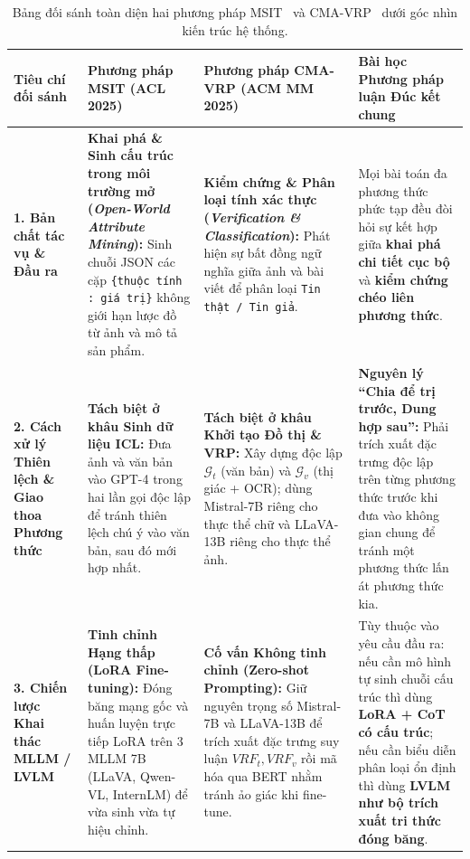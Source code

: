 \documentclass[conference,10pt]{IEEEtran}
\begin{document}
\begin{table}[!t]
\centering
\caption{Bảng đối sánh toàn diện hai phương pháp MSIT~\cite{li2025msit} và CMA-VRP~\cite{li2025cmavrp} dưới góc nhìn kiến trúc hệ thống.}
\label{tab:comparison_msit_cmavrp}
\begin{tabularx}{\textwidth}{L{2.8cm} Y Y Y}
\toprule
\textbf{Tiêu chí đối sánh} & \textbf{Phương pháp MSIT (ACL 2025)}~\cite{li2025msit} & \textbf{Phương pháp CMA-VRP (ACM MM 2025)}~\cite{li2025cmavrp} & \textbf{Bài học Phương pháp luận Đúc kết chung} \\
\midrule
\textbf{1. Bản chất tác vụ \& Đầu ra} & \textbf{Khai phá \& Sinh cấu trúc trong môi trường mở (\textit{Open-World Attribute Mining}):} Sinh chuỗi JSON các cặp \texttt{\{thuộc tính : giá trị\}} không giới hạn lược đồ từ ảnh và mô tả sản phẩm. & \textbf{Kiểm chứng \& Phân loại tính xác thực (\textit{Verification \& Classification}):} Phát hiện sự bất đồng ngữ nghĩa giữa ảnh và bài viết để phân loại \texttt{Tin thật / Tin giả}. & Mọi bài toán đa phương thức phức tạp đều đòi hỏi sự kết hợp giữa \textbf{khai phá chi tiết cục bộ} và \textbf{kiểm chứng chéo liên phương thức}. \\
\midrule
\textbf{2. Cách xử lý Thiên lệch \& Giao thoa Phương thức} & \textbf{Tách biệt ở khâu Sinh dữ liệu ICL:} Đưa ảnh và văn bản vào GPT-4 trong hai lần gọi độc lập để tránh thiên lệch chú ý vào văn bản, sau đó mới hợp nhất. & \textbf{Tách biệt ở khâu Khởi tạo Đồ thị \& VRP:} Xây dựng độc lập $\mathcal{G}_t$ (văn bản) và $\mathcal{G}_v$ (thị giác + OCR); dùng Mistral-7B riêng cho thực thể chữ và LLaVA-13B riêng cho thực thể ảnh. & \textbf{Nguyên lý ``Chia để trị trước, Dung hợp sau'':} Phải trích xuất đặc trưng độc lập trên từng phương thức trước khi đưa vào không gian chung để tránh một phương thức lấn át phương thức kia. \\
\midrule
\textbf{3. Chiến lược Khai thác MLLM / LVLM} & \textbf{Tinh chỉnh Hạng thấp (LoRA Fine-tuning):} Đóng băng mạng gốc và huấn luyện trực tiếp LoRA trên 3 MLLM 7B (LLaVA, Qwen-VL, InternLM) để vừa sinh vừa tự hiệu chỉnh. & \textbf{Cố vấn Không tinh chỉnh (Zero-shot Prompting):} Giữ nguyên trọng số Mistral-7B và LLaVA-13B để trích xuất đặc trưng suy luận $VRF_t, VRF_v$ rồi mã hóa qua BERT nhằm tránh ảo giác khi fine-tune. & Tùy thuộc vào yêu cầu đầu ra: nếu cần mô hình tự sinh chuỗi cấu trúc thì dùng \textbf{LoRA + CoT có cấu trúc}; nếu cần biểu diễn phân loại ổn định thì dùng \textbf{LVLM như bộ trích xuất tri thức đóng băng}. \\

\end{tabularx}
\end{table}
\end{document}
